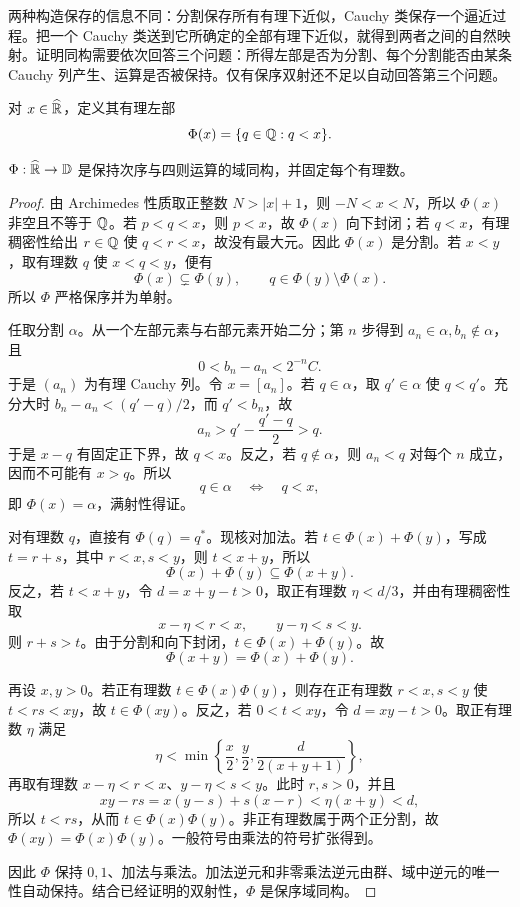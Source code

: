 两种构造保存的信息不同：分割保存所有有理下近似，Cauchy 类保存一个逼近过程。把一个 Cauchy 类送到它所确定的全部有理下近似，就得到两者之间的自然映射。证明同构需要依次回答三个问题：所得左部是否为分割、每个分割能否由某条 Cauchy 列产生、运算是否被保持。仅有保序双射还不足以自动回答第三个问题。


对 \(x\in\widehat{\mathbb{R}}\)，定义其有理左部
\[
 \Phi(x)=\{q\in\mathbb{Q}:q<x\}.
\]

\begin{theorem}
\(\Phi:\widehat{\mathbb{R}}\to\mathbb D\) 是保持次序与四则运算的域同构，并固定每个有理数。
\end{theorem}

\begin{proof}
由 Archimedes 性质取正整数 \(N>|x|+1\)，则 \(-N<x<N\)，所以 \(\Phi(x)\) 非空且不等于 \(\mathbb{Q}\)。若 \(p<q<x\)，则 \(p<x\)，故 \(\Phi(x)\) 向下封闭；若 \(q<x\)，有理稠密性给出 \(r\in\mathbb{Q}\) 使 \(q<r<x\)，故没有最大元。因此 \(\Phi(x)\) 是分割。若 \(x<y\)，取有理数 \(q\) 使 \(x<q<y\)，便有
\[
 \Phi(x)\subsetneq\Phi(y),\qquad q\in\Phi(y)\setminus\Phi(x).
\]
所以 \(\Phi\) 严格保序并为单射。

任取分割 \(\alpha\)。从一个左部元素与右部元素开始二分；第 \(n\) 步得到 \(a_n\in\alpha,b_n\notin\alpha\)，且
\[
 0<b_n-a_n<2^{-n}C.
\]
于是 \((a_n)\) 为有理 Cauchy 列。令 \(x=[a_n]\)。若 \(q\in\alpha\)，取 \(q'\in\alpha\) 使 \(q<q'\)。充分大时 \(b_n-a_n<(q'-q)/2\)，而 \(q'<b_n\)，故
\[
  a_n>q'-\frac{q'-q}{2}>q.
\]
于是 \(x-q\) 有固定正下界，故 \(q<x\)。反之，若 \(q\notin\alpha\)，则 \(a_n<q\) 对每个 \(n\) 成立，因而不可能有 \(x>q\)。所以
\[
  q\in\alpha\quad\Longleftrightarrow\quad q<x,
\]
即 \(\Phi(x)=\alpha\)，满射性得证。

对有理数 \(q\)，直接有 \(\Phi(q)=q^*\)。现核对加法。若 \(t\in\Phi(x)+\Phi(y)\)，写成 \(t=r+s\)，其中 \(r<x,s<y\)，则 \(t<x+y\)，所以
\[
 \Phi(x)+\Phi(y)\subseteq\Phi(x+y).
\]
反之，若 \(t<x+y\)，令 \(d=x+y-t>0\)，取正有理数 \(\eta<d/3\)，并由有理稠密性取
\[
 x-\eta<r<x,\qquad y-\eta<s<y.
\]
则 \(r+s>t\)。由于分割和向下封闭，\(t\in\Phi(x)+\Phi(y)\)。故
\[
 \Phi(x+y)=\Phi(x)+\Phi(y).
\]

再设 \(x,y>0\)。若正有理数 \(t\in\Phi(x)\Phi(y)\)，则存在正有理数 \(r<x,s<y\) 使 \(t<rs<xy\)，故 \(t\in\Phi(xy)\)。反之，若 \(0<t<xy\)，令 \(d=xy-t>0\)。取正有理数 \(\eta\) 满足
\[
 \eta<\min\left\{\frac{x}{2},\frac{y}{2},
 \frac{d}{2(x+y+1)}\right\},
\]
再取有理数 \(x-\eta<r<x\)、\(y-\eta<s<y\)。此时 \(r,s>0\)，并且
\[
 xy-rs=x(y-s)+s(x-r)<\eta(x+y)<d,
\]
所以 \(t<rs\)，从而 \(t\in\Phi(x)\Phi(y)\)。非正有理数属于两个正分割，故 \(\Phi(xy)=\Phi(x)\Phi(y)\)。一般符号由乘法的符号扩张得到。

因此 \(\Phi\) 保持 \(0,1\)、加法与乘法。加法逆元和非零乘法逆元由群、域中逆元的唯一性自动保持。结合已经证明的双射性，\(\Phi\) 是保序域同构。
\end{proof}

